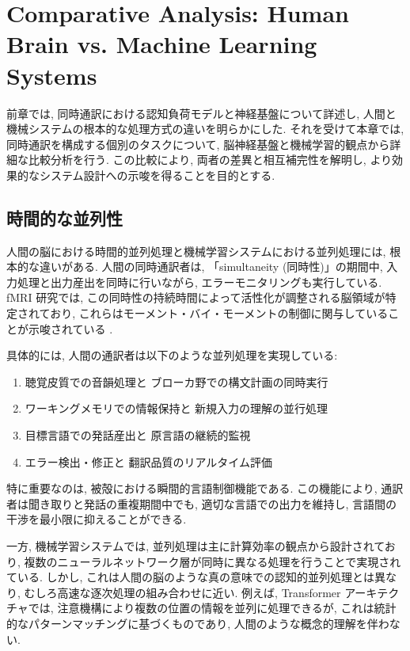 \section{Comparative Analysis: Human Brain vs. Machine Learning Systems}

前章では, 同時通訳における認知負荷モデルと神経基盤について詳述し, 人間と機械システムの根本的な処理方式の違いを明らかにした.
それを受けて本章では, 同時通訳を構成する個別のタスクについて, 脳神経基盤と機械学習的観点から詳細な比較分析を行う.
この比較により, 両者の差異と相互補完性を解明し, より効果的なシステム設計への示唆を得ることを目的とする.

\subsection{時間的な並列性}

人間の脳における時間的並列処理と機械学習システムにおける並列処理には, 根本的な違いがある.
人間の同時通訳者は, 「simultaneity (同時性)」の期間中, 入力処理と出力産出を同時に行いながら, エラーモニタリングも実行している.
fMRI 研究では, この同時性の持続時間によって活性化が調整される脳領域が特定されており, これらはモーメント・バイ・モーメントの制御に関与していることが示唆されている \cite{hervais2015fmri} .

具体的には, 人間の通訳者は以下のような並列処理を実現している:
\begin{enumerate}
\item 聴覚皮質での音韻処理と ブローカ野での構文計画の同時実行
\item ワーキングメモリでの情報保持と 新規入力の理解の並行処理
\item 目標言語での発話産出と 原言語の継続的監視
\item エラー検出・修正と 翻訳品質のリアルタイム評価
\end{enumerate}

特に重要なのは, 被殻における瞬間的言語制御機能である.
この機能により, 通訳者は聞き取りと発話の重複期間中でも, 適切な言語での出力を維持し, 言語間の干渉を最小限に抑えることができる.

一方, 機械学習システムでは, 並列処理は主に計算効率の観点から設計されており, 複数のニューラルネットワーク層が同時に異なる処理を行うことで実現されている.
しかし, これは人間の脳のような真の意味での認知的並列処理とは異なり, むしろ高速な逐次処理の組み合わせに近い.
例えば, Transformer アーキテクチャでは, 注意機構により複数の位置の情報を並列に処理できるが, これは統計的なパターンマッチングに基づくものであり, 人間のような概念的理解を伴わない.

